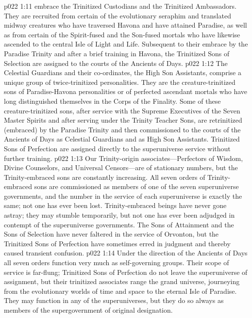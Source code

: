 \pc \vs p022 1:11  embrace the Trinitized Custodians and the Trinitized Ambassadors. They are recruited from certain of the evolutionary seraphim and translated midway creatures who have traversed Havona and have attained Paradise, as well as from certain of the Spirit\hyp{}fused and the Son\hyp{}fused mortals who have likewise ascended to the central Isle of Light and Life. Subsequent to their embrace by the Paradise Trinity and after a brief training in Havona, the Trinitized Sons of Selection are assigned to the courts of the Ancients of Days.
\pc \vs p022 1:12  The Celestial Guardians and their co\hyp{}ordinates, the High Son Assistants, comprise a unique group of twice\hyp{}trinitized personalities. They are the creature\hyp{}trinitized sons of Paradise\hyp{}Havona personalities or of perfected ascendant mortals who have long distinguished themselves in the Corps of the Finality. Some of these creature\hyp{}trinitized sons, after service with the Supreme Executives of the Seven Master Spirits and after serving under the Trinity Teacher Sons, are retrinitized (embraced) by the Paradise Trinity and then commissioned to the courts of the Ancients of Days as Celestial Guardians and as High Son Assistants. Trinitized Sons of Perfection are assigned directly to the superuniverse service without further training.
\pc \vs p022 1:13 Our Trinity\hyp{}origin associates---Perfectors of Wisdom, Divine Counselors, and Universal Censors---are of stationary numbers, but the Trinity\hyp{}embraced sons are constantly increasing. All seven orders of Trinity\hyp{}embraced sons are commissioned as members of one of the seven superuniverse governments, and the number in the service of each superuniverse is exactly the same; not one has ever been lost. Trinity\hyp{}embraced beings have never gone astray; they may stumble temporarily, but not one has ever been adjudged in contempt of the superuniverse governments. The Sons of Attainment and the Sons of Selection have never faltered in the service of Orvonton, but the Trinitized Sons of Perfection have sometimes erred in judgment and thereby caused transient confusion.
\vs p022 1:14 Under the direction of the Ancients of Days all seven orders function very much as self\hyp{}governing groups. Their scope of service is far\hyp{}flung; Trinitized Sons of Perfection do not leave the superuniverse of assignment, but their trinitized associates range the grand universe, journeying from the evolutionary worlds of time and space to the eternal Isle of Paradise. They may function in any of the superuniverses, but they do so always as members of the supergovernment of original designation.
